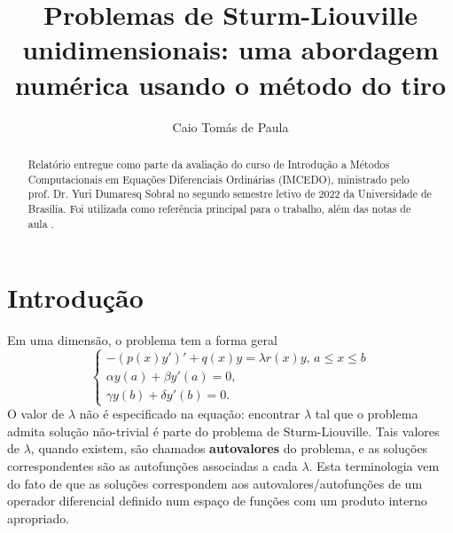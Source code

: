 \documentclass[twocolumn,showpacs,%
  nofootinbib,aps,superscriptaddress,%
  eqsecnum,prd,notitlepage,showkeys,10pt]{revtex4-1}
\renewcommand{\leq}{\leqslant}
\begin{document}
\title{
Problemas de Sturm-Liouville unidimensionais: 
uma abordagem numérica usando o método do tiro
}
\author{Caio Tomás de Paula}
%
\begin{abstract}
    Relatório entregue como parte da avaliação do curso de Introdução a
    Métodos Computacionais em Equações Diferenciais Ordinárias (IMCEDO),
    ministrado pelo prof. Dr. Yuri Dumaresq Sobral no segundo semestre letivo
    de 2022 da Universidade de Brasília. Foi utilizada 
    \cite{Sturm-Liouville} como referência principal para o trabalho, além
    das notas de aula \cite{notas-aula-IMCEDO}.
\end{abstract}
%
\maketitle
%
\section{Introdução}
%
Em uma dimensão, o problema tem a forma geral
%
\begin{equation}
\label{eq:forma-geral-SL-1D}
    \left\{
    \begin{array}{l}
        -(p(x)y')' + q(x)y = \lambda r(x)y, \, a \leq x \leq b \\
        \alpha y(a) + \beta y'(a) = 0, \\
        \gamma y(b) + \delta y'(b) = 0.
    \end{array}
    \right.
\end{equation}
%
O valor de $\lambda$ não é especificado na equação: encontrar $\lambda$
tal que o problema admita solução não-trivial é parte do problema de Sturm-Liouville.
Tais valores de $\lambda$, quando existem, são chamados \textbf{autovalores}
do problema, e as soluções correspondentes são as autofunções associadas
a cada $\lambda$. Esta terminologia vem do fato de que as soluções correspondem
aos autovalores/autofunções de um operador diferencial definido num espaço
de funções com um produto interno apropriado. 
\end{document}
